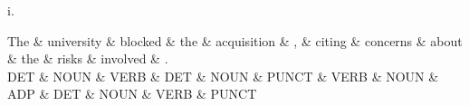 i. \\
\begin{center}
{

\begin{dependency}[] 
 \begin{deptext}
The \& university \& blocked \& the \& acquisition \& , \& citing \& concerns \& about \& the \& risks \& involved \& . \\
DET \& NOUN \& VERB \& DET \& NOUN \& PUNCT \& VERB \& NOUN \& ADP \& DET \& NOUN \& VERB \& PUNCT \\
\end{deptext}
\end{dependency}


 }
 \end{center}

